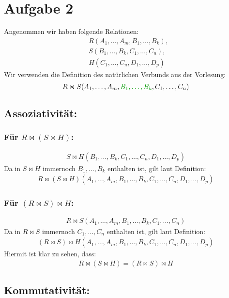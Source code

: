 \pagebreak
\section*{Aufgabe 2}
Angenommen wir haben folgende Relationen:
\begin{align*}
  &R(A_1,\dots,A_m,B_1,\dots,B_k), \\
  &S(B_1,\dots,B_k,C_1,\dots,C_n), \\
  &H(C_1,\dots,C_n,D_1,\dots,D_p)
\end{align*}
Wir verwenden die Definition des natürlichen Verbunds aus der Vorlesung:
\begin{align*}
  R \Join S(A_1,\dots,A_m,{\color{darkgreen} B_1,\dots,B_k},C_1,\dots,C_n)
\end{align*}
\subsection*{Assoziativität:}
\subsubsection*{Für $R \Join (S \Join H)$: }
\begin{align*}
  S\Join H(B_1,\dots,B_k,C_1,\dots,C_n,D_1,\dots,D_p)
\end{align*}
Da in $S\Join H$ immernoch $B_1,\dots,B_k$ enthalten ist, gilt laut Definition:
\begin{align*}
  R \Join (S \Join H)(A_1,\dots,A_m,B_1,\dots,B_k,C_1,\dots,C_n,D_1,\dots,D_p)
\end{align*}
\subsubsection*{Für $(R \Join S) \Join H$: }
\begin{align*}
  R\Join S(A_1,\dots,A_m,B_1,\dots,B_k,C_1,\dots,C_n)
\end{align*}
Da in $R\Join S$ immernoch $C_1,\dots,C_n$ enthalten ist, gilt laut Definition:
\begin{align*}
  (R \Join S) \Join H(A_1,\dots,A_m,B_1,\dots,B_k,C_1,\dots,C_n,D_1,\dots,D_p)
\end{align*}
Hiermit ist klar zu sehen, dass:
\begin{align*}
  R \Join (S \Join H) = (R \Join S) \Join H
\end{align*}
\subsection*{Kommutativität:}
